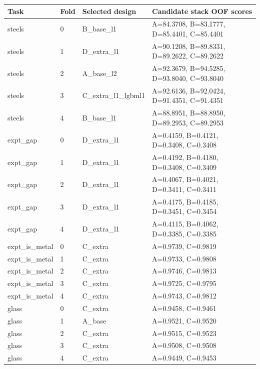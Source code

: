 \begin{tabular}{llll}
\toprule
Task & Fold & Selected design & Candidate stack OOF scores \\
\midrule
steels & 0 & B\_base\_l1 & A=84.3708, B=83.1777, D=85.4401, C=85.4401 \\
steels & 1 & D\_extra\_l1 & A=90.1208, B=89.8331, D=89.2622, C=89.2622 \\
steels & 2 & A\_base\_l2 & A=92.3679, B=94.5285, D=93.8040, C=93.8040 \\
steels & 3 & C\_extra\_l1\_lgbml1 & A=92.6136, B=92.0424, D=91.4351, C=91.4351 \\
steels & 4 & B\_base\_l1 & A=88.8951, B=88.8950, D=89.2953, C=89.2953 \\
expt\_gap & 0 & D\_extra\_l1 & A=0.4159, B=0.4121, D=0.3408, C=0.3408 \\
expt\_gap & 1 & D\_extra\_l1 & A=0.4192, B=0.4180, D=0.3408, C=0.3409 \\
expt\_gap & 2 & D\_extra\_l1 & A=0.4067, B=0.4021, D=0.3411, C=0.3411 \\
expt\_gap & 3 & D\_extra\_l1 & A=0.4175, B=0.4185, D=0.3451, C=0.3454 \\
expt\_gap & 4 & D\_extra\_l1 & A=0.4115, B=0.4062, D=0.3385, C=0.3385 \\
expt\_is\_metal & 0 & C\_extra & A=0.9739, C=0.9819 \\
expt\_is\_metal & 1 & C\_extra & A=0.9733, C=0.9808 \\
expt\_is\_metal & 2 & C\_extra & A=0.9746, C=0.9813 \\
expt\_is\_metal & 3 & C\_extra & A=0.9725, C=0.9795 \\
expt\_is\_metal & 4 & C\_extra & A=0.9743, C=0.9812 \\
glass & 0 & C\_extra & A=0.9458, C=0.9461 \\
glass & 1 & A\_base & A=0.9521, C=0.9520 \\
glass & 2 & C\_extra & A=0.9515, C=0.9523 \\
glass & 3 & C\_extra & A=0.9508, C=0.9508 \\
glass & 4 & C\_extra & A=0.9449, C=0.9453 \\
\bottomrule
\end{tabular}
